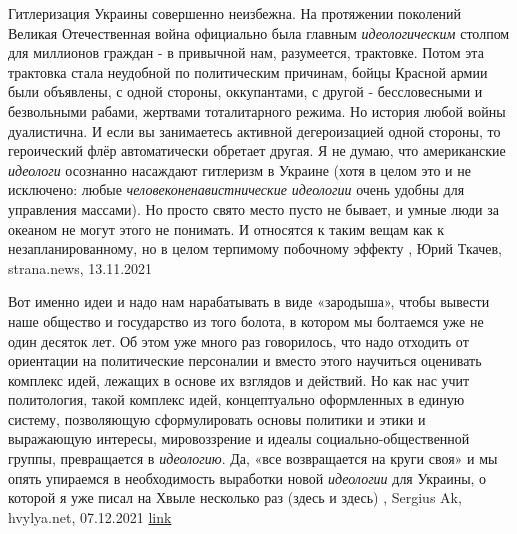 Гитлеризация Украины совершенно неизбежна.  На протяжении поколений Великая
Отечественная война официально была главным \emph{идеологическим} столпом для
миллионов граждан - в привычной нам, разумеется, трактовке.  Потом эта
трактовка стала неудобной по политическим причинам, бойцы Красной армии были
объявлены, с одной стороны, оккупантами, с другой - бессловесными и безвольными
рабами, жертвами тоталитарного режима.  Но история любой войны дуалистична. И
если вы занимаетесь активной дегероизацией одной стороны, то героический флёр
автоматически обретает другая.  Я не думаю, что американские \emph{идеологи} осознанно
насаждают гитлеризм в Украине (хотя в целом это и не исключено: любые
\emph{человеконенавистнические идеологии} очень удобны для управления массами). Но
просто свято место пусто не бывает, и умные люди за океаном не могут этого не
понимать. И относятся к таким вещам как к незапланированному, но в целом
терпимому побочному эффекту
, 
Юрий Ткачев, strana.news, 13.11.2021

Вот именно идеи и надо нам нарабатывать в виде «зародыша», чтобы вывести наше
общество и государство из того болота, в котором мы болтаемся уже не один
десяток лет. Об этом уже много раз говорилось, что надо отходить от ориентации
на политические персоналии и вместо этого научиться оценивать комплекс идей,
лежащих в основе их взглядов и действий. Но как нас учит политология, такой
комплекс идей, концептуально оформленных в единую систему, позволяющую
сформулировать основы политики и этики и выражающую интересы, мировоззрение и
идеалы социально-общественной группы, превращается в \emph{идеологию}. Да, «все
возвращается на круги своя» и мы опять упираемся в необходимость выработки
новой \emph{идеологии} для Украины, о которой я уже писал на Хвыле несколько раз
(здесь и здесь)
, 
Sergius Ak, hvylya.net, 07.12.2021
\href{https://hvylya.net/analytics/243091-ukraina-posle-zelenskogo}{link}
